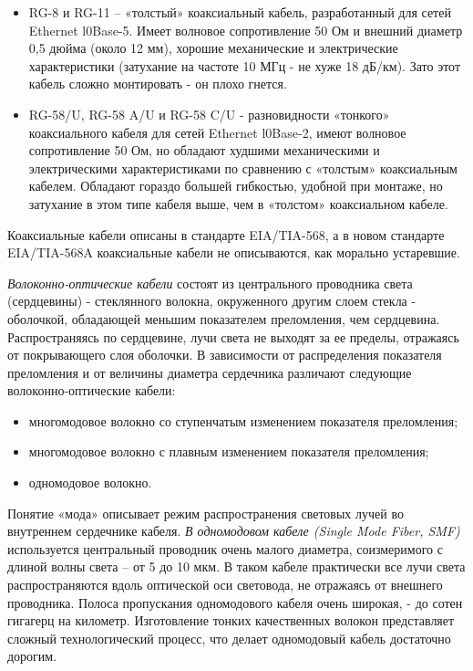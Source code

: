 \begin{itemize}
    \item RG-8 и RG-11 – «толстый» коаксиальный кабель, разработанный для сетей Ethernet l0Base-5.
        Имеет волновое сопротивление 50 Ом и внешний диаметр 0,5 дюйма (около 12 мм), хорошие механические и электрические характеристики (затухание на частоте 10 МГц - не хуже 18 дБ/км).
        Зато этот кабель сложно монтировать - он плохо гнется.
    \item RG-58/U, RG-58 A/U и RG-58 C/U - разновидности «тонкого» коаксиального кабеля для сетей Ethernet l0Base-2, имеют волновое сопротивление 50 Ом, но обладают худшими механическими и электрическими характеристиками по сравнению с «толстым» коаксиальным кабелем.
        Обладают гораздо большей гибкостью, удобной при монтаже, но затухание в этом типе кабеля выше, чем в «толстом» коаксиальном кабеле.
\end{itemize}

Коаксиальные кабели описаны в стандарте EIA/TIA-568, а в новом стандарте EIA/TIA-568A коаксиальные кабели не описываются, как морально устаревшие.

\emph{Волоконно-оптические кабели} состоят из центрального проводника света (сердцевины) - стеклянного волокна, окруженного другим слоем стекла - оболочкой, обладающей меньшим показателем преломления, чем сердцевина.
Распространяясь по сердцевине, лучи света не выходят за ее пределы, отражаясь от покрывающего слоя оболочки.
В зависимости от распределения показателя преломления и от величины диаметра сердечника различают следующие волоконно-оптические кабели:
\begin{itemize}
    \item многомодовое волокно со ступенчатым изменением показателя преломления;
    \item многомодовое волокно с плавным изменением показателя преломления;
    \item одномодовое волокно.
\end{itemize}

Понятие «мода» описывает режим распространения световых лучей во внутреннем сердечнике кабеля.
\emph{В одномодовом кабеле (Single Mode Fiber, SMF)} используется центральный проводник очень малого диаметра, соизмеримого с длиной волны света – от 5 до 10 мкм.
В таком кабеле практически все лучи света распространяются вдоль оптической оси световода, не отражаясь от внешнего проводника.
Полоса пропускания одномодового кабеля очень широкая, - до сотен гигагерц на километр.
Изготовление тонких качественных волокон представляет сложный технологический процесс, что делает одномодовый кабель достаточно дорогим.

